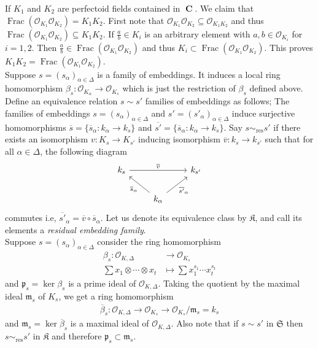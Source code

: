 \documentclass[12pts,a4paper]{amsart}
\DeclareMathOperator{\Frac}{Frac}
\DeclareMathOperator{\C}{\textbf{C}}
\begin{document}
If $K_1$ and $K_2$ are perfectoid fields contained in $\C$. We claim that $\Frac(\mathcal{O}_{K_1}\mathcal{O}_{K_2})=K_1K_2$. First note that $\mathcal{O}_{K_1}\mathcal{O}_{K_2}\subseteq \mathcal{O}_{K_1K_2}$ and thus $\Frac(\mathcal{O}_{K_1}\mathcal{O}_{K_2})\subseteq K_1K_2$. If $\frac{a}{b}\in K_i$ is an arbitrary element with $a,b\in\mathcal{O}_{K_i}$ for $i=1,2$. Then $\frac{a}{b}\in\Frac(\mathcal{O}_{K_1}\mathcal{O}_{K_2})$ and thus $K_i\subset \Frac(\mathcal{O}_{K_1}\mathcal{O}_{K_2})$. This proves $K_1K_2=\Frac(\mathcal{O}_{K_1}\mathcal{O}_{K_2})$.\\

Suppose $s=(s_\alpha)_{\alpha\in\Delta}$ is a family of embeddings. It induces a local ring homomorphism $\beta_s: \mathcal{O}_{K_\alpha}\to \mathcal{O}_{K_s}$ which is just the restriction of $\beta_s$ defined above. Define an equivalence relation $s\sim s'$ families of embeddings as follows; The families of embeddings $s=(s_\alpha)_{\alpha\in\Delta}$ and $s'=(s'_\alpha)_{\alpha\in\Delta}$ induce surjective homomorphisms $\overline{s}=\{\overline{s}_\alpha: k_\alpha\to k_s\}$ and $\overline{s'}=\{\overline{s}_\alpha:k_\alpha\to k_s\}$. Say $s\sim_{\text{res}} s'$ if there exists an isomorphism $v: K_s\to K_{s'}$ inducing isomorphism $\overline{v}:k_s\to k_{s'}$ such that for all $\alpha\in\Delta$, the following diagram
\[
\begin{tikzcd}
	k_s \arrow[rr,"\overline{v}"]  &             &   k_{s'}\\
	                &  \arrow[ul,"\overline{s}_\alpha"]k_\alpha \arrow[ur,swap,"\overline{s'}_\alpha"] &
\end{tikzcd}
\]
commutes i.e, $\overline{s'}_\alpha=\overline{v}\circ \overline{s}_\alpha$. Let us denote its equivalence class by $\mathfrak{K}$, and call its elements a \emph{residual embedding family}. \\

Suppose $s=(s_\alpha)_{\alpha\in\Delta}$ consider the ring homomorphism
\begin{align*}
	\beta_s: \mathcal{O}_{K,\Delta}&\to \mathcal{O}_{K_s}\\
	                \sum x_1\otimes\cdots\otimes x_t &\mapsto \sum x^{s_1}_1\cdots x^{s_t}_t
\end{align*}
and $\mathfrak{p}_s=\ker\beta_s$ is a prime ideal of $\mathcal{O}_{K,\Delta}$. Taking the quotient by the maximal ideal $\mathfrak{m}_s$ of $K_s$, we get a ring homomorphism
\begin{align*}
	\overline{\beta}_s: \mathcal{O}_{K,\Delta}\to \mathcal{O}_{K_s}\to \mathcal{O}_{K_s}/\mathfrak{m}_s=k_s
\end{align*}
and $\mathfrak{m}_s=\ker\overline{\beta}_s$ is a maximal ideal of $\mathcal{O}_{K,\Delta}$. Also note that if $s\sim s'$ in $\mathfrak{S}$ then $s\sim_{\text{res}}s'$ in $\mathfrak{K}$ and therefore $\mathfrak{p}_s\subset \mathfrak{m}_s$.
\end{document}
